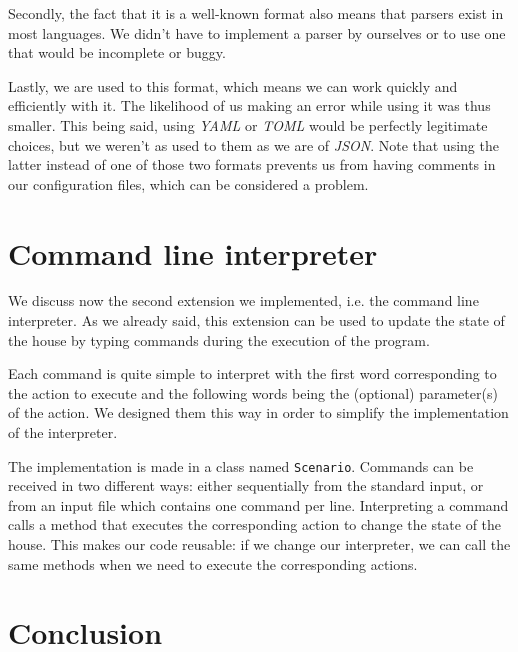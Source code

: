 		Secondly, the fact that it is a well-known format also means that parsers exist in most languages. We didn't have to implement a parser by ourselves or to use one that would be incomplete or buggy.

		Lastly, we are used to this format, which means we can work quickly and efficiently with it. The likelihood of us making an error while using it was thus smaller. This being said, using \textit{YAML} or \textit{TOML} would be perfectly legitimate choices, but we weren't as used to them as we are of \textit{JSON}. Note that using the latter instead of one of those two formats prevents us from having comments in our configuration files, which can be considered a problem.
	
	\section{Command line interpreter}
		We discuss now the second extension we implemented, i.e. the command line interpreter. As we already said, this extension can be used to update the state of the house by typing commands during the execution of the program.
		
		Each command is quite simple to interpret with the first word corresponding to the action to execute and the following words being the (optional) parameter(s) of the action. We designed them this way in order to simplify the implementation of the interpreter.
		
		The implementation is made in a class named \texttt{Scenario}. Commands can be received in two different ways: either sequentially from the standard input, or from an input file which contains one command per line. Interpreting a command calls a method that executes the corresponding action to change the state of the house. This makes our code reusable: if we change our interpreter, we can call the same methods when we need to execute the corresponding actions.

	\section{Conclusion}


